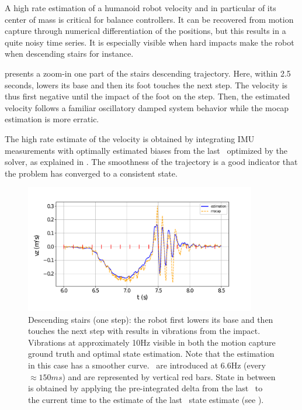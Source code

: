 A high rate estimation of a humanoid robot velocity and in particular of its center of mass is critical for balance controllers. It can be recovered 
from motion capture through numerical differentiation of the positions, but this results in a quite noisy time series. It is especially visible when hard impacts 
make the robot when descending stairs for instance.

 presents a zoom-in one part of the stairs descending trajectory. Here, within 2.5 seconds,  lowers 
its base and then its foot touches the next step. The velocity is thus first negative until the impact of the foot on the step. Then, the estimated velocity follows 
a familiar oscillatory damped system behavior while the mocap estimation is more erratic. 

The high rate estimate of the velocity is obtained by integrating IMU measurements with optimally estimated biases from the last \keyframe\ 
optimized by the solver, as explained in . The smoothness of the trajectory is a good indicator that the problem has converged to a consistent state.


\begin{figure}[h]
    \centering
    \includegraphics[width=0.9\textwidth]{figures/absolute/vz_descending_onestep_with_kf.pdf}
    \caption{Descending stairs (one step): the robot first lowers its base and then touches the next step with results in vibrations from the impact.
    Vibrations at approximately 10Hz visible in both the motion capture ground truth and optimal state estimation. Note that the estimation in this case has a smoother curve.
    \keyframes\ are introduced at 6.6Hz (every $\approx 150 ms$) and are represented by vertical red bars. State in between is obtained by applying the pre-integrated 
    delta from the last \keyframe\ to the current time to the estimate of the last \keyframe\ state estimate (see \secRef{sec:publish-state}).}
    \label{fig:vz_descending_onestep}
\end{figure}




